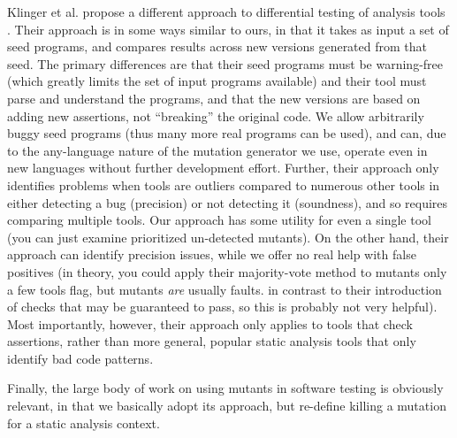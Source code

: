 Klinger et al. propose a different approach to differential testing of analysis tools \cite{klinger2019differentially}.  Their approach is in some ways similar to ours, in that it takes as input a set of seed programs, and compares results across new versions generated from that seed.  The primary differences are that their seed programs must be warning-free (which greatly limits the set of input programs available) and their tool must parse and understand the programs, and that the new versions are based on adding new assertions, not ``breaking'' the original code.  We allow arbitrarily buggy seed programs (thus many more real programs can be used), and can, due to the any-language nature of the mutation generator we use, operate even in new languages without further development effort.  Further, their approach only identifies problems when tools are outliers compared to numerous other tools in either detecting a bug (precision) or not detecting it (soundness), and so requires comparing multiple tools.  Our approach has some utility for even a single tool (you can just examine prioritized un-detected mutants).  On the other hand, their approach can identify precision issues, while we offer no real help with false positives (in theory, you could apply their majority-vote method to mutants only a few tools flag, but mutants \emph{are} usually faults. in contrast to their introduction of checks that may be guaranteed to pass, so this is probably not very helpful).  Most importantly, however, their approach only applies to tools that check assertions, rather than more general, popular static analysis tools that only identify bad code patterns.

Finally, the large body of work on using mutants in software testing \cite{jia2011analysis,demillo1978hints,budd1980theoretical, groce2015verified,groce2018verified,MutGoogle,ivankovic2018industrial,mutKernel} is obviously relevant, in that we basically adopt its approach, but re-define killing a mutation for a static analysis context.